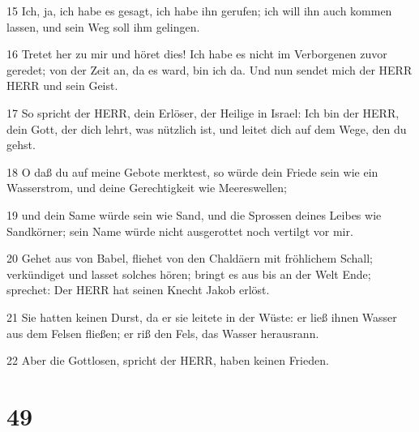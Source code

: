 \par 15 Ich, ja, ich habe es gesagt, ich habe ihn gerufen; ich will ihn auch kommen lassen, und sein Weg soll ihm gelingen.
\par 16 Tretet her zu mir und höret dies! Ich habe es nicht im Verborgenen zuvor geredet; von der Zeit an, da es ward, bin ich da. Und nun sendet mich der HERR HERR und sein Geist.
\par 17 So spricht der HERR, dein Erlöser, der Heilige in Israel: Ich bin der HERR, dein Gott, der dich lehrt, was nützlich ist, und leitet dich auf dem Wege, den du gehst.
\par 18 O daß du auf meine Gebote merktest, so würde dein Friede sein wie ein Wasserstrom, und deine Gerechtigkeit wie Meereswellen;
\par 19 und dein Same würde sein wie Sand, und die Sprossen deines Leibes wie Sandkörner; sein Name würde nicht ausgerottet noch vertilgt vor mir.
\par 20 Gehet aus von Babel, fliehet von den Chaldäern mit fröhlichem Schall; verkündiget und lasset solches hören; bringt es aus bis an der Welt Ende; sprechet: Der HERR hat seinen Knecht Jakob erlöst.
\par 21 Sie hatten keinen Durst, da er sie leitete in der Wüste: er ließ ihnen Wasser aus dem Felsen fließen; er riß den Fels, das Wasser herausrann.
\par 22 Aber die Gottlosen, spricht der HERR, haben keinen Frieden.

\chapter{49}


